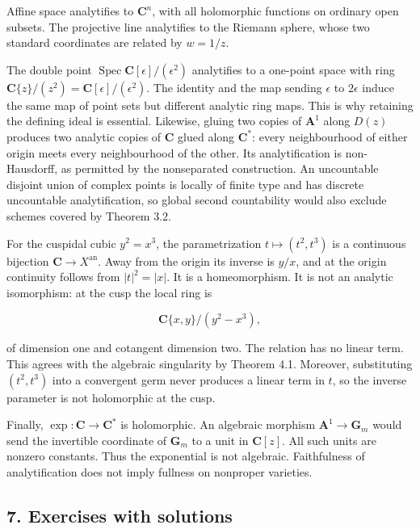 \documentclass[11pt]{article}
\begin{document}
Affine space analytifies to \(\mathbf C^n\), with all holomorphic
functions on ordinary open subsets. The projective line analytifies to
the Riemann sphere, whose two standard coordinates are related by
\(w=1/z\).

The double point \(\operatorname{Spec}\mathbf C[\epsilon]/(\epsilon^2)\)
analytifies to a one-point space with ring
\(\mathbf C\{z\}/(z^2)=\mathbf C[\epsilon]/(\epsilon^2)\). The identity
and the map sending \(\epsilon\) to \(2\epsilon\) induce the same map of
point sets but different analytic ring maps. This is why retaining the
defining ideal is essential. Likewise, gluing two copies of
\(\mathbf A^1\) along \(D(z)\) produces two analytic copies of
\(\mathbf C\) glued along \(\mathbf C^*\): every neighbourhood of either
origin meets every neighbourhood of the other. Its analytification is
non-Hausdorff, as permitted by the nonseparated construction. An
uncountable disjoint union of complex points is locally of finite type
and has discrete uncountable analytification, so global second
countability would also exclude schemes covered by Theorem 3.2.

For the cuspidal cubic \(y^2=x^3\), the parametrization
\(t\mapsto(t^2,t^3)\) is a continuous bijection
\(\mathbf C\to X^{\mathrm{an}}\). Away from the origin its inverse is
\(y/x\), and at the origin continuity follows from \(|t|^2=|x|\). It is
a homeomorphism. It is not an analytic isomorphism: at the cusp the
local ring is

\[
\mathbf C\{x,y\}/(y^2-x^3),
\]

of dimension one and cotangent dimension two. The relation has no linear
term. This agrees with the algebraic singularity by Theorem 4.1.
Moreover, substituting \((t^2,t^3)\) into a convergent germ never
produces a linear term in \(t\), so the inverse parameter is not
holomorphic at the cusp.

Finally, \(\exp:\mathbf C\to\mathbf C^*\) is holomorphic. An algebraic
morphism \(\mathbf A^1\to\mathbf G_m\) would send the invertible
coordinate of \(\mathbf G_m\) to a unit in \(\mathbf C[z]\). All such
units are nonzero constants. Thus the exponential is not algebraic.
Faithfulness of analytification does not imply fullness on nonproper
varieties.

\subsection{7. Exercises with solutions}\label{exercises-with-solutions}
\end{document}

